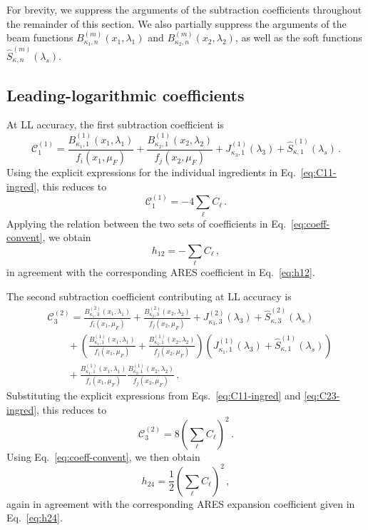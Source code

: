 For brevity, we suppress the arguments of the subtraction coefficients
throughout the remainder of this section. We also partially suppress the
arguments of the beam functions
$B_{\kappa_1,n}^{(m)}(x_1,\lambda_1)$ and
$B_{\kappa_2,n}^{(m)}(x_2,\lambda_2)$, as well as the soft functions
$\widehat{S}_{\kappa,n}^{(m)}(\lambda_s)$.


\subsection{Leading-logarithmic  coefficients}
\label{subsec:LL-coeff}

At LL accuracy, the first subtraction coefficient is
\begin{equation}
\label{eq:C11}
    \mathcal{C}_1^{(1)}=\frac{B_{\kappa_1,1}^{(1)}(x_1,\lambda_1)}{f_i(x_1,\mu_F)}+\frac{B_{\kappa_2,1}^{(1)}(x_2,\lambda_2)}{f_j(x_2,\mu_F)}+
    J_{\kappa_3,1}^{(1)}(\lambda_3)
    +\widehat{S}^{(1)}_{\kappa,1}\left(\lambda_s\right)\,.
\end{equation}
Using the explicit expressions for the individual ingredients in
Eq.~\eqref{eq:C11-ingred}, this reduces to
\begin{equation}
    \mathcal{C}^{(1)}_1=-4\sum_{\ell}C_{\ell}\,.
\end{equation}
Applying the relation between the two sets of coefficients in Eq.~\eqref{eq:coeff-convent}, we
obtain
\begin{equation}
    h_{12}=-\sum_{\ell}C_{\ell}\,,
\end{equation}
in agreement with the corresponding \textsc{ARES} coefficient in
Eq.~\eqref{eq:h12}.

The second subtraction coefficient contributing at LL accuracy is
\begin{equation}
\begin{aligned}
	&\mathcal{C}^{(2)}_3=\frac{B_{\kappa_1,3}^{(2)}(x_1,\lambda_1)}{f_i(x_1,\mu_F)}+\frac{B_{\kappa_2,3}^{(2)}(x_2,\lambda_2)}{f_j(x_2,\mu_F)}+
    J_{\kappa_3,3}^{(2)}(\lambda_3)
    +\widehat{S}^{(2)}_{\kappa,3}\left(\lambda_s\right)\\[0.5ex]
    &\qquad +\left(\frac{B^{(1)}_{\kappa_1,1}(x_1,\lambda_1)}{f_i(x_1,\mu_F)}+\frac{B^{(1)}_{\kappa_2,1}(x_2,\lambda_2)}{f_j(x_2,\mu_F)}\right)\left(J_{\kappa_1,1}^{(1)}(\lambda_3)+\widehat{S}_{\kappa,1}^{(1)}(\lambda_s)\right)\\
    &\qquad+\frac{B^{(1)}_{\kappa_1,1}(x_1,\lambda_1)}{f_i(x_1,\mu_F)}\frac{B^{(1)}_{\kappa_2,1}(x_2,\lambda_2)}{f_j(x_2,\mu_F)}\,.
 \end{aligned}   
\end{equation}
Substituting the explicit expressions from
Eqs.~\eqref{eq:C11-ingred} and \eqref{eq:C23-ingred}, this reduces to
\begin{equation}
    \mathcal{C}^{(2)}_3=8\left(\sum_{\ell}C_{\ell}\right)^2\,.
\end{equation}
Using Eq.~\eqref{eq:coeff-convent}, we then obtain
\begin{equation}
    h_{24}=\frac{1}{2}\left(\sum_{\ell}C_{\ell}\right)^2\,,
\end{equation}
again in agreement with the corresponding \textsc{ARES} expansion coefficient
given in Eq.~\eqref{eq:h24}.

